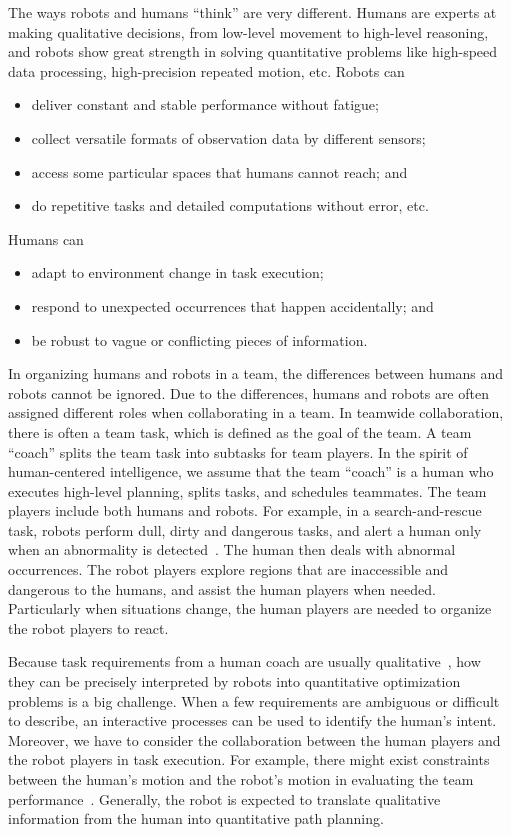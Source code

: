 \documentclass[phd]{byuprop}
\begin{document}
The ways robots and humans ``think'' are very different.
Humans are experts at making qualitative decisions, from low-level movement to high-level reasoning,
and robots show great strength in solving quantitative problems like high-speed data processing, high-precision repeated motion, etc.
Robots can
\begin{itemize}
\item deliver constant and stable performance without fatigue;
\item collect versatile formats of observation data by different sensors;
\item access some particular spaces that humans cannot reach; and
\item do repetitive tasks and detailed computations without error, etc.
\end{itemize}
Humans can
\begin{itemize}
\item adapt to environment change in task execution;
\item respond to unexpected occurrences that happen accidentally; and
\item be robust to vague or conflicting pieces of information. 
\end{itemize}
In organizing humans and robots in a team, the differences between humans and robots cannot be ignored.
Due to the differences, humans and robots are often assigned different roles when collaborating in a team.
In teamwide collaboration, there is often a team task, which is defined as the goal of the team.
A team ``coach'' splits the team task into subtasks for team players.
In the spirit of human-centered intelligence, we assume that the team ``coach'' is a human who executes high-level planning, splits tasks, and schedules teammates.
The team players include both humans and robots.
For example, in a search-and-rescue task, robots perform dull, dirty and dangerous tasks, and alert a human only when an abnormality is detected~\cite{Nourbakhsh2005}.
The human then deals with abnormal occurrences.
The robot players explore regions that are inaccessible and dangerous to the humans, and assist the human players when needed.
Particularly when situations change, the human players are needed to organize the robot players to react.

Because task requirements from a human coach are usually qualitative~\cite{brenner2007mediating}, how they can be precisely interpreted by robots into quantitative optimization problems is a big challenge.
When a few requirements are ambiguous or difficult to describe, an interactive processes can be used to identify the human's intent.
Moreover, we have to consider the collaboration between the human players and the robot players in task execution.
For example, there might exist constraints between the human's motion and the robot's motion in evaluating the team performance~\cite{Yi2014a}.
Generally, the robot is expected to translate qualitative information from the human into quantitative path planning.
\end{document}
